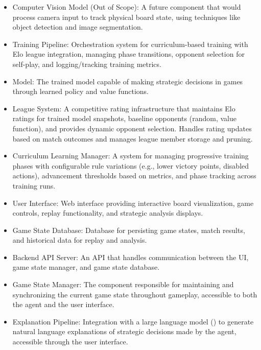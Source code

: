 \documentclass{article}
\begin{document}
\begin{itemize}
    \item Computer Vision Model (Out of Scope): A future component that would process camera input to track physical board state, using techniques like object detection and image segmentation.

    \item Training Pipeline: Orchestration system for curriculum-based training with Elo league integration, managing phase transitions, opponent selection for self-play, and logging/tracking training metrics.

    \item \AI{} Model: The trained model capable of making strategic decisions in \emph{\Catan{}} games through learned policy and value functions.

    \item \Elo{} League System: A competitive rating infrastructure that maintains Elo ratings for trained model snapshots, baseline opponents (random, value function), and provides dynamic opponent selection. Handles rating updates based on match outcomes and manages league member storage and pruning.

    \item Curriculum Learning Manager: A system for managing progressive training phases with configurable rule variations (e.g., lower victory points, disabled actions), advancement thresholds based on metrics, and phase tracking across training runs.

    \item User Interface: Web interface providing interactive board visualization, game controls, replay functionality, and strategic analysis displays.

    \item Game State Database: Database for persisting game states, match results, and historical data for replay and analysis.

    \item Backend API Server: An API that handles communication between the UI, game state manager, and game state database.

    \item Game State Manager: The component responsible for maintaining and synchronizing the current game state throughout gameplay, accessible to both the \AI{} agent and the user interface.

    \item Explanation Pipeline: Integration with a large language model (\LLM{}) to generate natural language explanations of strategic decisions made by the \AI{} agent, accessible through the user interface.
\end{itemize}
\end{document}
